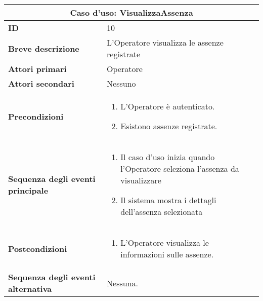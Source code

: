 \documentclass[a4paper]{report}
\begin{document}
\clearpage
\begin{table}[H]
\vspace*{-0cm}
\renewcommand{\arraystretch}{1.9}
\begin{tabular}{|p{3.9cm}|p{9.9cm}|}
\hline
\multicolumn{2}{|c|}{\textbf{Caso d’uso: VisualizzaAssenza}} \\ \hline
\textbf{ID} & 10 \\ \hline
\textbf{Breve descrizione} & L’Operatore visualizza le assenze registrate \\ \hline
\textbf{Attori primari} & Operatore \\ \hline
\textbf{Attori secondari} & Nessuno \\ \hline
\textbf{Precondizioni} & \begin{enumerate}[leftmargin=14pt,label=\arabic*.,labelsep=0.5em,topsep=0pt,partopsep=0pt,parsep=0pt,itemsep=0pt]
    \item L’Operatore è autenticato.
    \item Esistono assenze registrate.
\end{enumerate} \\ \hline
\textbf{Sequenza degli eventi principale} & \begin{enumerate}[leftmargin=14pt,label=\arabic*.,labelsep=0.5em,topsep=0pt,partopsep=0pt,parsep=0pt,itemsep=0pt]
    \item Il caso d’uso inizia quando l’Operatore seleziona l'assenza da visualizzare
    \item Il sistema mostra i dettagli dell’assenza selezionata
\end{enumerate} \\ \hline
\textbf{Postcondizioni} & \begin{enumerate}[label=\arabic*.,leftmargin=14pt,labelsep=0.5em,topsep=0pt,partopsep=0pt,parsep=0pt,itemsep=0pt]
        \item L’Operatore visualizza le informazioni sulle assenze.
\end{enumerate} \\ \hline
\textbf{Sequenza degli eventi alternativa} & Nessuna. \\ \hline
\end{tabular}
\end{table}
\end{document}
